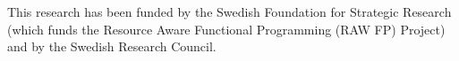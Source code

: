 This research has been funded by the Swedish Foundation for
Strategic Research (which funds the Resource Aware Functional 
Programming (RAW FP) Project) and by the
Swedish Research Council.




%
%




%
